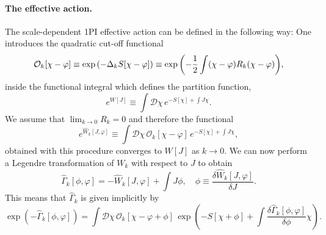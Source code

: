 \documentclass[a4paper,12pt]{article}
\begin{document}
\paragraph{The effective action.} The scale-dependent 1PI effective action can be defined in the following way: One introduces the quadratic cut-off functional
\begin{equation}
                 {\mathcal O}_k [\chi-\varphi]\equiv \exp{\left(-\Delta_k S[\chi-\varphi]\right)}\equiv\exp{\left( -\frac{1}{2}\int(\chi-\varphi)R_k(\chi-\varphi)\right)},
\end{equation}
inside the functional integral which defines the partition function,
\begin{equation}
                 e^{W[J]}\equiv\int{\mathcal D}\chi\, e^{-S[\chi]+\int J\chi}.
\end{equation}
We assume that $\lim_{k\to 0}R_k=0$ and therefore the functional
\begin{equation}
                 e^{\widehat{W}_k [J,\varphi]}\equiv\int{\mathcal D}\chi\, {\mathcal O}_k[\chi-\varphi]\, e^{-S[\chi]+\int J\chi},
\end{equation}
obtained with this procedure converges to $W[J]$ as $k\to 0$. We can now perform a Legendre transformation of $W_k$ with respect to $J$ to obtain
\begin{equation}
                 \widehat{\Gamma}_k[\phi,\varphi]=-\widehat{W}_k[J,\varphi]+\int J \phi, \quad \phi \equiv \frac{\delta \widehat{W}_k[J,\varphi]}{\delta J}. 
\end{equation}
This means that $\widehat{\Gamma}_k$ is given implicitly by
\begin{equation}\label{impl}
                \exp{\left(-\widehat{\Gamma}_k[\phi,\varphi]\right)} = \int{\mathcal D} \chi \, {\mathcal O}_k [\chi-\varphi+\phi] \, \exp{\left(-S[\chi+\phi]+\int\frac{\delta \widehat{\Gamma}_k [\phi,\varphi]}{\delta \phi}\chi\right)}.
\end{equation}
\end{document}
